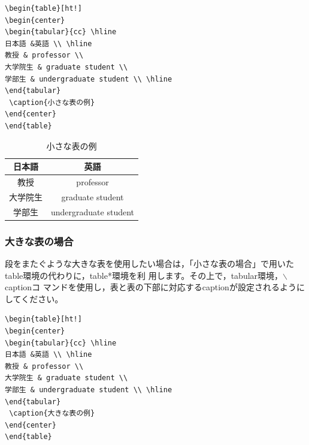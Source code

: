 \documentclass[b5paper,10pt,twocolumn,tombow]{jarticle}
\begin{document}
\begin{verbatim}
\begin{table}[ht!]
\begin{center}
\begin{tabular}{cc} \hline
日本語 &英語 \\ \hline
教授 & professor \\
大学院生 & graduate student \\
学部生 & undergraduate student \\ \hline
\end{tabular}
 \caption{小さな表の例}
\end{center}
\end{table}
\end{verbatim}

\begin{table}[ht!]
\begin{center}
\begin{tabular}{cc} \hline
日本語 &英語 \\ \hline
教授 & professor \\
大学院生 & graduate student \\
学部生 & undergraduate student \\ \hline
\end{tabular}
 \caption{小さな表の例}
\end{center}
\end{table}

\subsubsection*{大きな表の場合}
段をまたぐような大きな表を使用したい場合は，「小さな表の場合」で用いた
table環境の代わりに，table*環境を利
用します。その上で，tabular環境，$\backslash$captionコ
マンドを使用し，表と表の下部に対応するcaptionが設定されるようにしてください。

\begin{verbatim}
\begin{table}[ht!]
\begin{center}
\begin{tabular}{cc} \hline
日本語 &英語 \\ \hline
教授 & professor \\
大学院生 & graduate student \\
学部生 & undergraduate student \\ \hline
\end{tabular}
 \caption{大きな表の例}
\end{center}
\end{table}
\end{verbatim}
\end{document}
